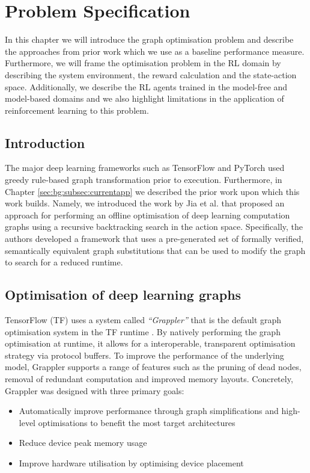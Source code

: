 \chapter{Problem Specification}

In this chapter we will introduce the graph optimisation problem and describe the approaches from prior work which we use as a baseline performance measure. Furthermore, we will frame the optimisation problem in the RL domain by describing the system environment, the reward calculation and the state-action space. Additionally, we describe the RL agents trained in the model-free and model-based domains and we also highlight limitations in the application of reinforcement learning to this problem.

\section{Introduction}
The major deep learning frameworks such as TensorFlow \cite{tensorflow2015-whitepaper} and PyTorch \cite{pytorch} used greedy rule-based graph transformation prior to execution. Furthermore, in Chapter \ref{sec:bg:subsec:currentapp} we described the prior work upon which this work builds. Namely, we introduced the work by Jia et al. \cite{jia2019taso,jia2019optimizing} that proposed an approach for performing an offline optimisation of deep learning computation graphs using a recursive backtracking search in the action space. Specifically, the authors developed a framework that uses a pre-generated set of formally verified, semantically equivalent graph substitutions that can be used to modify the graph to search for a reduced runtime.

\section{Optimisation of deep learning graphs}

TensorFlow (TF) uses a system called \textit{``Grappler''} that is the default graph optimisation system in the TF runtime \cite{larsen2019tensorflow}. By natively performing the graph optimisation at runtime, it allows for a interoperable, transparent optimisation strategy via protocol buffers. To improve the performance of the underlying model, Grappler supports a range of features such as the pruning of dead nodes, removal of redundant computation and improved memory layouts. Concretely, Grappler was designed with three primary goals:

\begin{itemize}
  \item Automatically improve performance through graph simplifications and high-level optimisations to benefit the most target architectures
  \item Reduce device peak memory usage
  \item Improve hardware utilisation by optimising device placement
\end{itemize}

